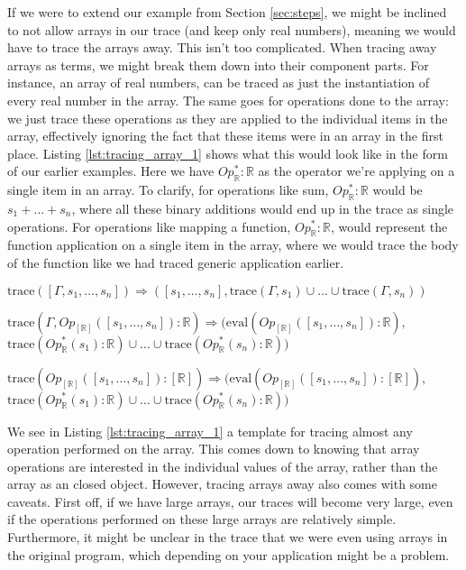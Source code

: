         If we were to extend our example from Section \ref{sec:steps}, we might be inclined to not allow arrays in our trace (and keep only real numbers), meaning we would have to trace the arrays away.
        This isn't too complicated.
        When tracing away arrays as terms, we might break them down into their component parts.
        For instance, an array of real numbers, can be traced as just the instantiation of every real number in the array.
        The same goes for operations done to the array: we just trace these operations as they are applied to the individual items in the array, effectively ignoring the fact that these items were in an array in the first place.
        Listing \ref{lst:tracing_array_1} shows what this would look like in the form of our earlier examples.
        Here we have $Op^*_\mathbb{R}:\mathbb{R}$ as the operator we're applying on a single item in an array.
        To clarify, for operations like sum, $Op^*_\mathbb{R}:\mathbb{R}$ would be $s_1+\dots+s_n$, where all these binary additions would end up in the trace as single operations.
        For operations like mapping a function, $Op^*_\mathbb{R}:\mathbb{R}$, would represent the function application on a single item in the array, where we would trace the body of the function like we had traced generic application earlier.

        \begin{quicklst}[caption=Tracing away arrays, label=lst:tracing_array_1, gobble=12]
            $\text{trace}([\Gamma,s_1,\dots,s_n])\Rightarrow([s_1,\dots,s_n],\text{trace}(\Gamma,s_1)\cup\dots\cup\text{trace}(\Gamma,s_n))$

            $\text{trace}(\Gamma,Op_{[\mathbb{R}]}([s_1,\dots,s_n]):\mathbb{R})\Rightarrow(\text{eval}(Op_{[\mathbb{R}]}([s_1,\dots,s_n]):\mathbb{R}),$
                $\text{trace}(Op^*_\mathbb{R}(s_1):\mathbb{R})\cup\dots\cup\text{trace}(Op^*_\mathbb{R}(s_n):\mathbb{R}))$

            $\text{trace}(Op_{[\mathbb{R}]}([s_1,\dots,s_n]):[\mathbb{R}])\Rightarrow(\text{eval}(Op_{[\mathbb{R}]}([s_1,\dots,s_n]):[\mathbb{R}]),$
                $\text{trace}(Op^*_\mathbb{R}(s_1):\mathbb{R})\cup\dots\cup\text{trace}(Op^*_\mathbb{R}(s_n):\mathbb{R}))$
        \end{quicklst}

        We see in Listing \ref{lst:tracing_array_1} a template for tracing almost any operation performed on the array.
        This comes down to knowing that array operations are interested in the individual values of the array, rather than the array as an closed object.
        However, tracing arrays away also comes with some caveats.
        First off, if we have large arrays, our traces will become very large, even if the operations performed on these large arrays are relatively simple.
        Furthermore, it might be unclear in the trace that we were even using arrays in the original program, which depending on your application might be a problem.

